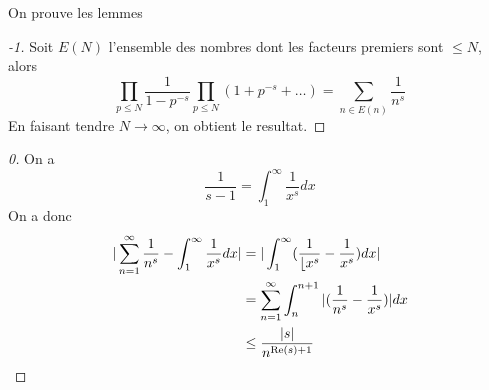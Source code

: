 \documentclass[../main.tex]{subfiles}
\begin{document}
On prouve les lemmes
\begin{proof}[-1]
	
Soit $E( N)$ l'ensemble des nombres dont les facteurs premiers sont $ \leq N$, alors
\[ 
\prod_{p \leq N} \frac{1}{1-p^{-s}} \prod_{p \leq N}  ( 1+ p^{-s}+ \ldots) = \sum_{n \in E( n) } \frac{1}{n^{s}}
\]
En faisant tendre $N\to \infty $, on obtient le resultat.
\end{proof}
\begin{proof}[0]
On a 
\[ 
\frac{1}{s-1}= \int_{ 1 }^{ \infty  }\frac{1}{x^{s}}dx
\]
On a donc
\begin{align*}
\vert\sum_{n=1}^{ \infty } \frac{1}{n^{s}}- \int_{ 1 }^{ \infty  } \frac{1}{x^{s}}dx \vert &= \vert\int_{ 1 }^{ \infty  }(  \frac{1}{\lfloor{x}^{s}}- \frac{1}{x^{s}} )dx\vert\\
&= \sum_{n=1}^{ \infty } \int_{ n }^{ n+1 } |( \frac{1}{n^{s}}- \frac{1}{x^{s}})| dx \\
& \leq \frac{|s|}{n^{\operatorname{Re}( s) +1}}	
\end{align*}

\end{proof}
\end{document}
